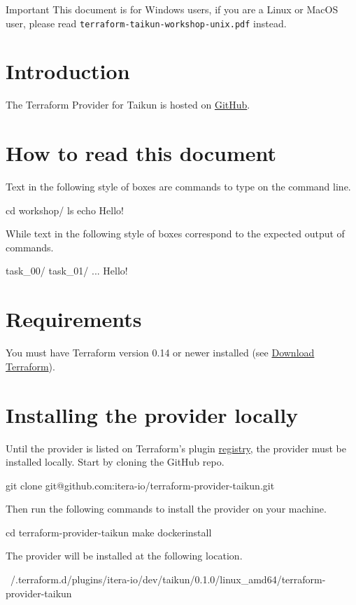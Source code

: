 \begin{important}{Important}
  This document is for Windows users, if you are a Linux or MacOS user, please read \texttt{terraform-taikun-workshop-unix.pdf} instead.
\end{important}

\section{Introduction}

The Terraform Provider for Taikun is hosted on \href{https://github.com/itera-io/terraform-provider-taikun}{GitHub}.
\blindtext{}

\section{How to read this document}

Text in the following style of boxes are commands to type on the command line.
\begin{shell}
cd workshop/
ls
echo Hello!
\end{shell}
While text in the following style of boxes correspond to the expected output of commands.
\begin{raw}
task_00/
task_01/
...
Hello!
\end{raw}

\section{Requirements}
You must have Terraform version 0.14 or newer installed (see \href{https://www.terraform.io/downloads.html}{Download Terraform}).

\section{Installing the provider locally}
Until the provider is listed on Terraform's plugin \href{https://registry.terraform.io/browse/providers}{registry}, the provider must be installed locally.
Start by cloning the GitHub repo.
\begin{shell}
git clone git@github.com:itera-io/terraform-provider-taikun.git
\end{shell}
Then run the following commands to install the provider on your machine.
\begin{shell}
cd terraform-provider-taikun
make dockerinstall
\end{shell}
The provider will be installed at the following location.
\begin{raw}
~/.terraform.d/plugins/itera-io/dev/taikun/0.1.0/linux_amd64/terraform-provider-taikun
\end{raw}

